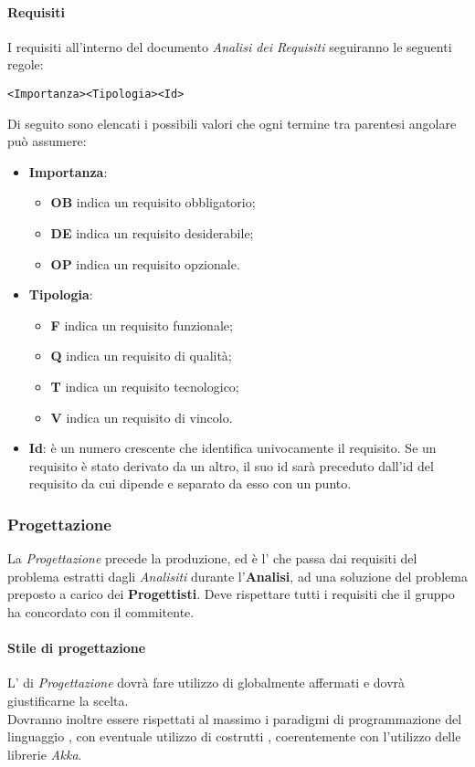 \documentclass{scalatekids-article}
\begin{document}
\paragraph{Requisiti}
\label{sec:adr}
I requisiti all'interno del documento \textit{Analisi dei Requisiti} seguiranno le seguenti regole:
\begin{center}
  \verb=<Importanza><Tipologia><Id>=
\end{center}
Di seguito sono elencati i possibili valori che ogni termine tra parentesi angolare può assumere:
\begin{itemize}
\item \textbf{Importanza}:
  \begin{itemize}
  \item \textbf{OB} indica un requisito obbligatorio;
  \item \textbf{DE} indica un requisito desiderabile;
  \item \textbf{OP} indica un requisito opzionale.
  \end{itemize}
\item \textbf{Tipologia}:
  \begin{itemize}
  \item \textbf{F} indica un requisito funzionale;
  \item \textbf{Q} indica un requisito di qualità;
  \item \textbf{T} indica un requisito tecnologico;
  \item \textbf{V} indica un requisito di vincolo.
  \end{itemize}
\item \textbf{Id}: è un numero crescente che identifica univocamente il requisito. Se un requisito è stato derivato da un altro, il suo id sarà preceduto dall'id del requisito da cui dipende e separato da esso con un punto.
\end{itemize}
\subsubsection{Progettazione}
La \textit{Progettazione} precede la produzione, ed è l' che
passa dai requisiti del problema estratti dagli \textit{Analisiti} durante
l'\textbf{Analisi}, ad una soluzione del problema preposto a carico dei
\textbf{Progettisti}. Deve rispettare tutti i requisiti che il gruppo ha
concordato con il commitente.
\paragraph{Stile di progettazione}
L' di \textit{Progettazione} dovrà fare utilizzo di
 globalmente affermati e dovrà giustificarne la
scelta.\\Dovranno inoltre essere rispettati al massimo i paradigmi di
programmazione  del linguaggio , con eventuale utilizzo
di costrutti , coerentemente con l'utilizzo delle librerie
\textit{Akka}.
\end{document}
